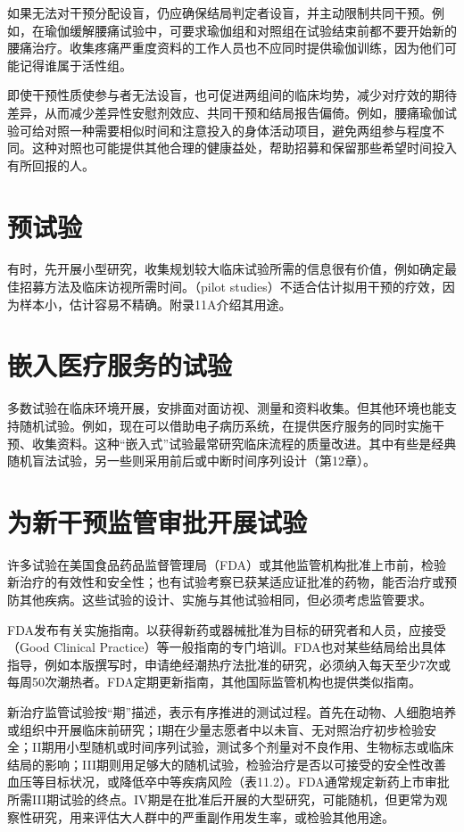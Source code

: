如果无法对干预分配设盲，仍应确保结局判定者设盲，并主动限制共同干预。例如，在瑜伽缓解腰痛试验中，可要求瑜伽组和对照组在试验结束前都不要开始新的腰痛治疗。收集疼痛严重度资料的工作人员也不应同时提供瑜伽训练，因为他们可能记得谁属于活性组。

即使干预性质使参与者无法设盲，也可促进两组间的临床均势，减少对疗效的期待差异，从而减少差异性安慰剂效应、共同干预和结局报告偏倚。例如，腰痛瑜伽试验可给对照一种需要相似时间和注意投入的身体活动项目，避免两组参与程度不同。这种对照也可能提供其他合理的健康益处，帮助招募和保留那些希望时间投入有所回报的人。

\section{预试验}
有时，先开展小型研究，收集规划较大临床试验所需的信息很有价值，例如确定最佳招募方法及临床访视所需时间。（pilot studies）不适合估计拟用干预的疗效，因为样本小，估计容易不精确。附录11A介绍其用途。

\section{嵌入医疗服务的试验}
多数试验在临床环境开展，安排面对面访视、测量和资料收集。但其他环境也能支持随机试验。例如，现在可以借助电子病历系统，在提供医疗服务的同时实施干预、收集资料。这种“嵌入式”试验最常研究临床流程的质量改进。其中有些是经典随机盲法试验，另一些则采用前后或中断时间序列设计（第12章）。

\section{为新干预监管审批开展试验}
许多试验在美国食品药品监督管理局（FDA）或其他监管机构批准上市前，检验新治疗的有效性和安全性；也有试验考察已获某适应证批准的药物，能否治疗或预防其他疾病。这些试验的设计、实施与其他试验相同，但必须考虑监管要求。

FDA发布有关实施指南。以获得新药或器械批准为目标的研究者和人员，应接受（Good Clinical Practice）等一般指南的专门培训。FDA也对某些结局给出具体指导，例如本版撰写时，申请绝经潮热疗法批准的研究，必须纳入每天至少7次或每周50次潮热者。FDA定期更新指南，其他国际监管机构也提供类似指南。

新治疗监管试验按“期”描述，表示有序推进的测试过程。首先在动物、人细胞培养或组织中开展临床前研究；I期在少量志愿者中以未盲、无对照治疗初步检验安全；II期用小型随机或时间序列试验，测试多个剂量对不良作用、生物标志或临床结局的影响；III期则用足够大的随机试验，检验治疗是否以可接受的安全性改善血压等目标状况，或降低卒中等疾病风险（表11.2）。FDA通常规定新药上市审批所需III期试验的终点。IV期是在批准后开展的大型研究，可能随机，但更常为观察性研究，用来评估大人群中的严重副作用发生率，或检验其他用途。

